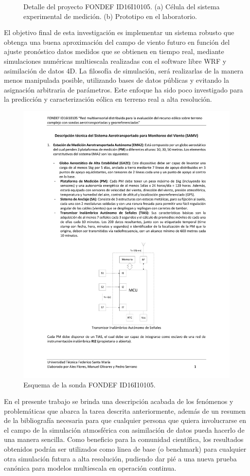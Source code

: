 \begin{figure}
\begin{minipage}{0.5\linewidth}
	\end{minipage}
	\caption{Detalle del proyecto FONDEF ID16I10105. (a) Célula del sistema experimental de medición. (b) Prototipo en el laboratorio.}
	\label{fig:01_detalle_fondef}
\end{figure}

El objetivo final de esta investigación es implementar un sistema robusto que obtenga una buena aproximación del campo de viento futuro en función del ajuste pronóstico  datos medidos que se obtienen en tiempo real, mediante simulaciones numéricas multiescala realizadas con el software libre WRF y asimilación de datos 4D. La filosofía de simulación, será realizarlas de la manera menos manipulada posible, utilizando bases de datos públicas y evitando la asignación arbitraria de parámetros. Este enfoque ha sido poco investigado para la predicción y caracterización eólica en terreno real a alta resolución. 

\begin{figure}[h!]
	\centering
	\includegraphics[width=0.82\linewidth,page=5,trim={3cm 2cm 2.3cm 3cm},clip]{Imagenes/01/descrp}
	\caption{Esquema de la sonda FONDEF ID16I10105.}
	\label{fig:01_sonda}
\end{figure}

En el presente trabajo se brinda una descripción acabada de los fenómenos y problemáticas que abarca la tarea descrita anteriormente, además de un resumen de la bibliografía necesaria para que cualquier persona que quiera involucrarse en el campo de la simulación atmosférica con asimilación de datos pueda hacerlo de una manera sencilla. Como beneficio para la comunidad científica, los resultados obtenidos podrán ser utilizados como linea de base (o benchmark) para cualquier otra simulación futura a alta resolución, pudiendo dar pié a una nueva prueba canónica para modelos multiescala en operación continua.


